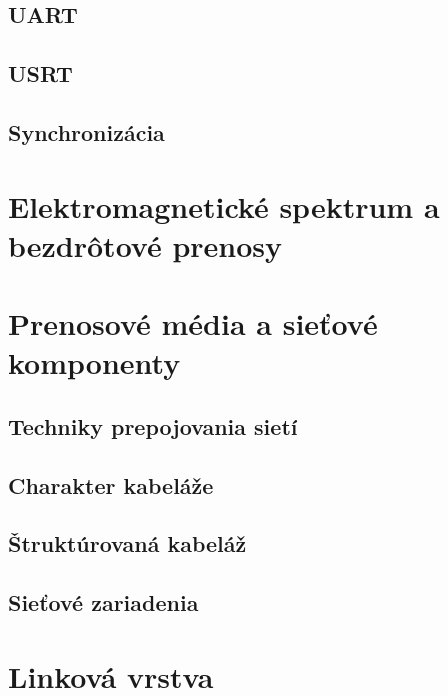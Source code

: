 \documentclass[10pt,a4paper]{article}
\begin{document}
\subsection{UART}        
\subsection{USRT}     
\subsection{Synchronizácia}   


\section{Elektromagnetické spektrum a bezdrôtové prenosy}  


\section{Prenosové média a sieťové komponenty} 
\subsection{Techniky prepojovania sietí}  
\subsection{Charakter kabeláže}     
\subsection{Štruktúrovaná kabeláž}  
\subsection{Sieťové zariadenia}           

 
\section{Linková vrstva}        
\end{document}
